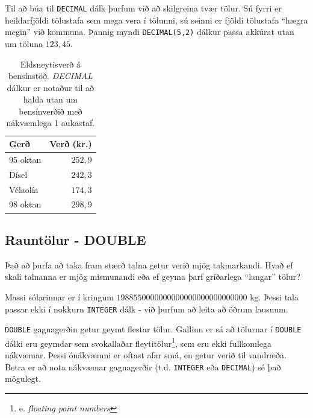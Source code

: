 Til að búa til \verb|DECIMAL| dálk þurfum við að skilgreina tvær tölur. Sú fyrri er heildarfjöldi tölustafa sem mega vera í tölunni, sú seinni er fjöldi tölustafa ``hægra megin'' við kommuna. Þannig myndi \verb|DECIMAL(5,2)| dálkur passa akkúrat utan um töluna $123,45$.

\begin{table}
\centering
\caption[Eldsneyti]{Eldsneytisverð á bensínstöð. \emph{DECIMAL} dálkur er notaður til að halda utan um bensínverðið með nákvæmlega 1 aukastaf.}
\label{tafla:eldsneyti}
\begin{tabular}{lr}
\toprule
Gerð&Verð (kr.)\\
\midrule
95 oktan&$252,9$\\
Dísel&$242,3$\\
Vélaolía&$174,3$\\
98 oktan&$298,9$\\
\bottomrule
\end{tabular}
\end{table}

\begin{example}
\caption[Eldsneytisverð]{SQL-framsetning á eldsneytisverðinu í töflu \ref{tafla:eldsneyti}. Verðið er geymt í dálki sem tekur við tugabroti með fjóra markverða stafi, þar af einum fyrir aftan kommu. \emph{INSERT} skipun fylgir með (sjá nánar í kafla \ref{undirkafli:innsetning}). Athugum að \emph{INSERT} skipunin tekur við tölum á ensku formi, sem notar punkta þar sem kommur eru notaðar í íslensku (og öfugt). Væri reynt að setja tugabrotið inn með kommu væri það túlkað sem skipting á milli dálka!}
\label{sql:k3d6-eldsneyti}
\centering
{}
\end{example}

\subsection{Rauntölur - DOUBLE}
Það að þurfa að taka fram stærð talna getur verið mjög takmarkandi. Hvað ef skali talnanna er mjög mismunandi eða ef geyma þarf gríðarlega ``langar'' tölur? 

Massi sólarinnar er í kringum $1988550000000000000000000000000$ kg. Þessi tala passar ekki í nokkurn \verb|INTEGER| dálk - við þurfum að leita að öðrum lausnum.

\verb|DOUBLE| gagnagerðin getur geymt flestar tölur. Gallinn er sá að tölurnar í \verb|DOUBLE| dálki eru geymdar sem svokallaðar fleytitölur\footnote{e. \emph{floating point numbers}}, sem eru ekki fullkomlega nákvæmar. Þessi ónákvæmni er oftast afar smá, en getur verið til vandræða. Betra er að nota nákvæmar gagnagerðir (t.d. \verb|INTEGER| eða \verb|DECIMAL|) sé það mögulegt.

